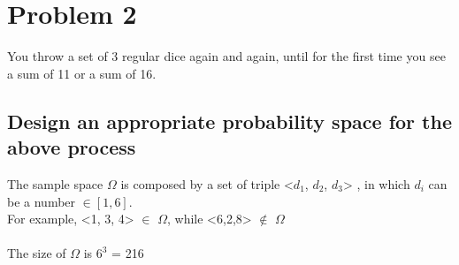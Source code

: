 \documentclass[oneside]{article}			%
\begin{document}
	\section*{Problem 2}
	You throw a set of 3 regular dice again and again, until for the first time you see a sum of 11 or a sum of 16.
	\subsection{Design an appropriate probability space for the above process}
	The sample space $\Omega$ is composed by a set of triple <$d_1$, $d_2$, $d_3$> , in which $d_i$ can be a number $\in [1, 6]$.
	\\
	For example, <1, 3, 4> $\in$ $\Omega$, while <6,2,8> $\notin$ $\Omega$
	\\\\
	The size of $\Omega$ is $6^3$ = 216
\end{document}
